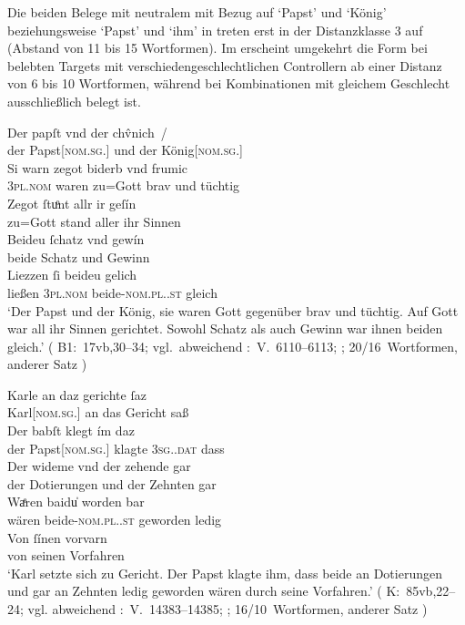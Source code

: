 Die beiden Belege mit neutralem  mit Bezug auf 
`Papst' und  `König' beziehungsweise 
`Papst' und  `ihm' in  treten erst in
der Distanzklasse 3 auf (Abstand von 11 bis 15 Wortformen). Im \CAO{}
erscheint umgekehrt die Form  bei belebten Targets mit
verschieden\-geschlechtlichen Controllern ab einer Distanz von 6 bis 10
Wortformen, während bei Kombinationen mit gleichem Geschlecht ausschließlich
 belegt ist.

\begin{exe}
\ex \label{ex:combgenddist2}
	\begin{xlist}
	\ex\label{ex:papstkoenig6} %
		\gll Der papſt vnd der chv̂nich~/ \\
			der Papst[\textsc{nom.sg.\MascM}] und der
			König[\textsc{nom.sg.\MascM}] \\
	\sn \gll Si warn zegot biderb vnd frumic \\
			\textsc{3pl\subM.nom} waren {zu=Gott} brav und tüchtig \\
	\sn \gll Zegot ſtuͦnt allr ir geſín \\
			{zu=Gott} stand aller ihr Sinnen \\
	\sn \gll Beideu ſchatz vnd gewín \\
			beide Schatz und Gewinn \\
	\sn \gll Liezzen ſi beideu gelich \\
			ließen \textsc{3pl\subM.nom} beide-\textsc{nom.pl.\NeutM.st}
			gleich \\
		\trans `Der Papst und der König, sie waren Gott gegenüber brav und
			tüchtig. Auf Gott war all ihr Sinnen gerichtet. Sowohl Schatz als
			auch Gewinn war ihnen beiden gleich.'
			(%
				B1:~17vb,30--34; vgl.~abweichend
				\KC:~V.~6110--6113;
				\cite[194]{schroeder1895};
				20/16~Wortformen, anderer Satz%
			)

	\ex\label{ex:babstimbaideu2}
		\gll Karle an daz gerichte ſaz \\
			Karl[\textsc{nom.sg.\MascM}] an das Gericht saß \\
	\sn \gll Der babſt klegt ím daz \\
			der Papst[\textsc{nom.sg.\MascM}] klagte \textsc{3sg.\MascM.dat} dass \\
	\sn \gll Der wideme vnd der zehende gar \\
			der Dotierungen und der Zehnten gar \\
	\sn \gll Waͤren baidu̍ worden bar \\
			wären beide-\textsc{nom.pl.\NeutM.st} geworden ledig \\
	\sn \gll Von ſínen vorvarn \\
			von seinen Vorfahren \\
		\trans `Karl setzte sich zu Gericht. Der Papst klagte ihm, dass
			beide an Dotierungen und gar an Zehnten ledig geworden wären durch
			seine Vorfahren.'
			(%
				K:~85vb,22--24; vgl. abweichend
				\KC:~V.~14383--14385;
				\cite[339]{schroeder1895};
				16/10~Wortformen, anderer Satz%
			)
	\end{xlist}
\end{exe}


